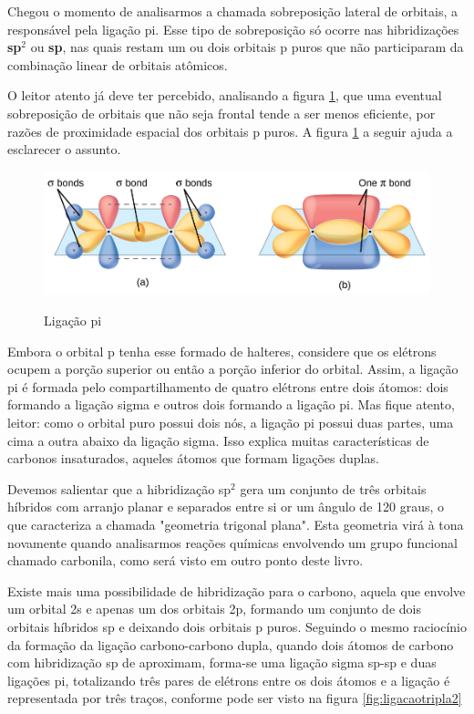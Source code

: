 \documentclass[a4paper,12pt]{book}
\begin{document}
Chegou o momento de analisarmos a chamada sobreposição lateral de orbitais, a responsável pela ligação pi. Esse tipo de sobreposição só ocorre nas hibridizações \textbf{sp{$^2$}} ou \textbf{sp}, nas quais restam um ou dois orbitais p puros que não participaram da combinação linear de orbitais atômicos.

O leitor atento já deve ter percebido, analisando a figura \ref{fig:ligacaopi}, que uma eventual sobreposição de orbitais que não seja frontal tende a ser menos eficiente, por razões de proximidade espacial dos orbitais p puros. A figura \ref{fig:ligacaopi} a seguir ajuda a esclarecer o assunto.

\begin{figure}[h]
	\centering
	\caption{Ligação pi}
	\vspace{0.5cm}
	\includegraphics[width=0.85\linewidth]{imagens/doublebond.jpeg}
	\label{fig:ligacaopi}
\end{figure}

Embora o orbital p tenha esse formado de halteres, considere que os elétrons ocupem a porção superior ou então a porção inferior do orbital. Assim, a ligação pi é formada pelo compartilhamento de quatro elétrons entre dois átomos: dois formando a ligação sigma e outros dois formando a ligação pi. Mas fique atento, leitor: como o orbital puro possui dois nós, a ligação pi possui duas partes, uma cima a outra abaixo da ligação sigma. Isso explica muitas características de carbonos insaturados, aqueles átomos que formam ligações duplas.

Devemos salientar que a hibridização sp{$^2$} gera um conjunto de três orbitais híbridos com arranjo planar e separados entre si or um ângulo de 120 graus, o que caracteriza a chamada "geometria trigonal plana". Esta geometria virá à tona novamente quando analisarmos reações químicas envolvendo um grupo funcional chamado carbonila, como será visto em outro ponto deste livro.

Existe mais uma possibilidade de hibridização para o carbono, aquela que envolve um orbital 2s e apenas um dos orbitais 2p, formando um conjunto de dois orbitais híbridos sp e deixando dois orbitais p puros. Seguindo o mesmo raciocínio da formação da ligação carbono-carbono dupla, quando dois átomos de carbono com hibridização sp de aproximam, forma-se uma ligação sigma sp-sp e duas ligações pi, totalizando três pares de elétrons entre os dois átomos e a ligação é representada por três traços, conforme pode ser visto na figura \ref{fig:ligacaotripla2}
\end{document}
